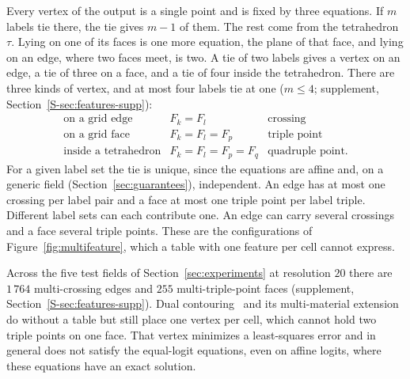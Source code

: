 \documentclass{egpubl}
\newcommand{\sref}[1]{\ref*{S-#1}}
\newcommand{\suppp}[1]{supplement, Section~\sref{#1}}
\theoremstyle{definition}
\newcommand{\tet}{\tau}
\newcommand{\interp}{F}
\begin{document}
Every vertex of the output is a single point and is fixed by three
equations. If $m$ labels tie there, the tie gives $m-1$ of them. The rest
come from the tetrahedron $\tet$. Lying on one of its faces is one more
equation, the plane of that face, and lying on an edge, where two faces meet,
is two. A tie of two labels gives a vertex on an edge, a tie of three on a
face, and a tie of four inside the tetrahedron. There are three
kinds of vertex, and at most four labels tie at one ($m \le 4$;
\suppp{sec:features-supp}):
\[
\begin{array}{lll}
  \text{on a grid edge} & \interp_k = \interp_l & \text{crossing} \\
  \text{on a grid face} & \interp_k = \interp_l = \interp_p & \text{triple point} \\
  \text{inside a tetrahedron} & \interp_k = \interp_l = \interp_p = \interp_q
    & \text{quadruple point.}
\end{array}
\]
For a given label set the tie is unique, since the equations are affine and,
on a generic field (Section~\ref{sec:guarantees}), independent. An edge has
at most one crossing per label pair and a face at most one triple point per
label triple. Different label sets can each contribute one. An edge can
carry several crossings and a face several triple points. These are the configurations of Figure~\ref{fig:multifeature},
which a table with one feature per cell cannot express.

Across the five test fields of Section~\ref{sec:experiments} at
resolution $20$ there are $1\,764$
multi-crossing edges and $255$ multi-triple-point faces
(\suppp{sec:features-supp}). Dual contouring~\cite{ju2002} and its
multi-material extension~\cite{mmdc2023} do without a table but still place
one vertex per cell, which cannot hold two triple points on one face. That
vertex minimizes a least-squares error and in general does not satisfy the
equal-logit equations, even on affine logits, where these equations have an
exact solution.
\end{document}
